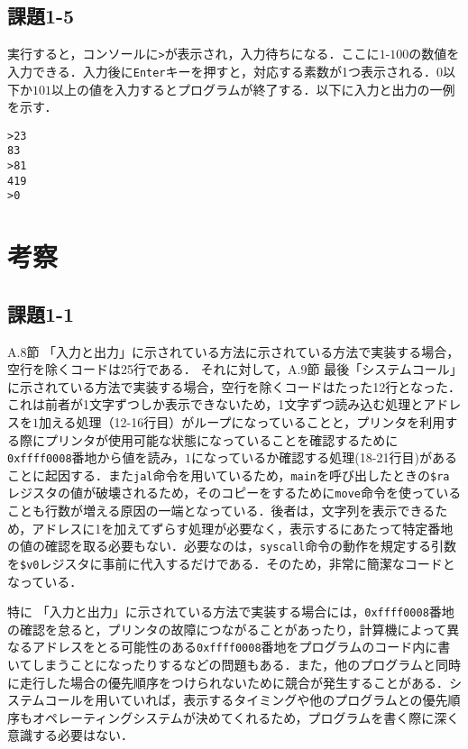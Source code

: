 \subsection{課題1-5}
実行すると，コンソールに\verb|>|が表示され，入力待ちになる．ここに$1$-$100$の数値を入力できる．入力後に\verb|Enter|キーを押すと，対応する素数が1つ表示される．$0$以下か$101$以上の値を入力するとプログラムが終了する．以下に入力と出力の一例を示す．
\begin{verbatim}
>23
83
>81
419
>0
\end{verbatim}

\section{考察} \label{sec:review}

\subsection{課題1-1}
A.8節 「入力と出力」に示されている方法に示されている方法で実装する場合，空行を除くコードは25行である．
それに対して，A.9節 最後「システムコール」に示されている方法で実装する場合，空行を除くコードはたった12行となった\cite{book:assembly}．
これは前者が1文字ずつしか表示できないため，1文字ずつ読み込む処理とアドレスを$1$加える処理（12-16行目）がループになっていることと，プリンタを利用する際にプリンタが使用可能な状態になっていることを確認するために\verb|0xffff0008|番地から値を読み，$1$になっているか確認する処理(18-21行目)があることに起因する．また\verb|jal|命令を用いているため，\verb|main|を呼び出したときの\verb|$ra|レジスタの値が破壊されるため，そのコピーをするために\verb|move|命令を使っていることも行数が増える原因の一端となっている．後者は，文字列を表示できるため，アドレスに1を加えてずらす処理が必要なく，表示するにあたって特定番地の値の確認を取る必要もない．必要なのは，\verb|syscall|命令の動作を規定する引数を\verb|$v0|レジスタに事前に代入するだけである．そのため，非常に簡潔なコードとなっている．

特に 「入力と出力」に示されている方法で実装する場合には，\verb|0xffff0008|番地の確認を怠ると，プリンタの故障につながることがあったり，計算機によって異なるアドレスをとる可能性のある\verb|0xffff0008|番地をプログラムのコード内に書いてしまうことになったりするなどの問題もある．また，他のプログラムと同時に走行した場合の優先順序をつけられないために競合が発生することがある．システムコールを用いていれば，表示するタイミングや他のプログラムとの優先順序もオペレーティングシステムが決めてくれるため，プログラムを書く際に深く意識する必要はない．

